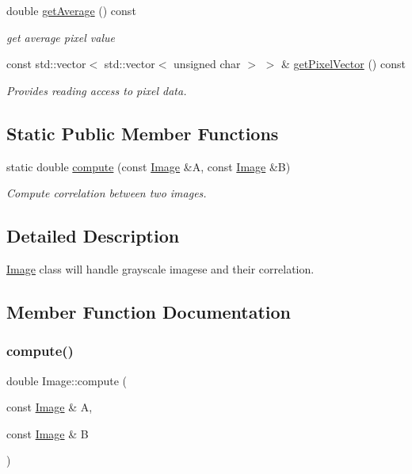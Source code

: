 \begin{DoxyCompactItemize}
double \mbox{\hyperlink{classImage_a9e6bad7a8619c428cac2b7d079c827c6}{get\+Average}} () const
\begin{DoxyCompactList}\small\item\em get average pixel value \end{DoxyCompactList}\item 
const std\+::vector$<$ std\+::vector$<$ unsigned char $>$ $>$ \& \mbox{\hyperlink{classImage_af41db2b0ba6d691495d23dd5db62eab1}{get\+Pixel\+Vector}} () const
\begin{DoxyCompactList}\small\item\em Provides reading access to pixel data. \end{DoxyCompactList}\end{DoxyCompactItemize}
\subsection*{Static Public Member Functions}
\begin{DoxyCompactItemize}
\item 
static double \mbox{\hyperlink{classImage_a367968335abbdae7b1f6838d883b73b1}{compute}} (const \mbox{\hyperlink{classImage}{Image}} \&A, const \mbox{\hyperlink{classImage}{Image}} \&B)
\begin{DoxyCompactList}\small\item\em Compute correlation between two images. \end{DoxyCompactList}\end{DoxyCompactItemize}


\subsection{Detailed Description}
\mbox{\hyperlink{classImage}{Image}} class will handle grayscale imagese and their correlation. 

\subsection{Member Function Documentation}
\mbox{\label{classImage_a367968335abbdae7b1f6838d883b73b1}} 
\subsubsection{\texorpdfstring{compute()}{compute()}}
{\footnotesize\ttfamily double Image\+::compute (\begin{DoxyParamCaption}\item[{const \mbox{\hyperlink{classImage}{Image}} \&}]{A,  }\item[{const \mbox{\hyperlink{classImage}{Image}} \&}]{B }\end{DoxyParamCaption})\hspace{0.3cm}{\ttfamily [static]}}



